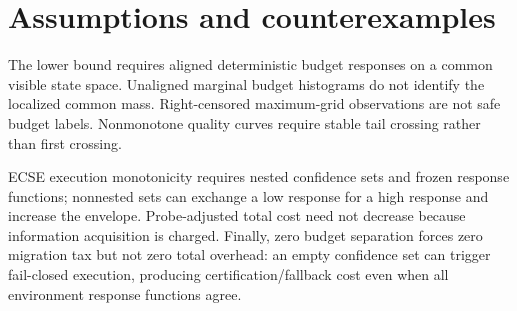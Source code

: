 \section{Assumptions and counterexamples}
The lower bound requires aligned deterministic budget responses on a common
visible state space. Unaligned marginal budget histograms do not identify the
localized common mass. Right-censored maximum-grid observations are not safe
budget labels. Nonmonotone quality curves require stable tail crossing rather
than first crossing.

ECSE execution monotonicity requires nested confidence sets and frozen response
functions; nonnested sets can exchange a low response for a high response and
increase the envelope. Probe-adjusted total cost need not decrease because
information acquisition is charged. Finally, zero budget separation forces
zero migration tax but not zero total overhead: an empty confidence set can
trigger fail-closed execution, producing certification/fallback cost even when
all environment response functions agree.
